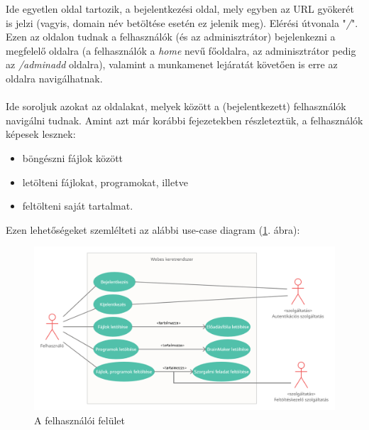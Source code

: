 Ide egyetlen oldal tartozik, a bejelentkezési oldal, mely egyben az URL gyökerét is jelzi (vagyis, domain név betöltése esetén ez jelenik meg). Elérési útvonala "\textit{/}". Ezen az oldalon tudnak a felhasználók (és az adminisztrátor) bejelenkezni a megfelelő oldalra (a felhasználók a \textit{home} nevű főoldalra, az adminisztrátor pedig az \textit{/adminadd} oldalra), valamint a munkamenet lejáratát követően is erre az oldalra navigálhatnak.\\

\\

Ide soroljuk azokat az oldalakat, melyek között a (bejelentkezett) felhasználók navigálni tudnak. Amint azt már korábbi fejezetekben részleteztük, a felhasználók képesek lesznek:

\begin{itemize}
\item{böngészni fájlok között}
\item{letölteni fájlokat, programokat, illetve}
\item{feltölteni saját tartalmat.}
\end{itemize}

Ezen lehetőségeket szemlélteti az alábbi use-case diagram (\ref{fig:userusecase}. ábra):

\begin{figure}[h]
	\centering
		\includegraphics[width=15truecm, height=10truecm]{images/felhasznalo_use_case.png}
	\caption{A felhasználói felület}
	\label{fig:userusecase}
\end{figure}

